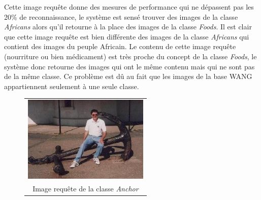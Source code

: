 	Cette image requête donne des mesures de performance qui ne dépassent pas les 20\% de reconnaissance, le système est sensé trouver des images de la classe \textit{Africans} alors qu'il retourne à la place des images de la classe \textit{Foods}. Il est clair que cette image requête est bien différente des images de la classe \textit{Africans} qui contient des images du peuple Africain. Le contenu de cette image requête (nourriture ou bien médicament) est très proche du concept de la classe \textit{Foods}, le système donc retourne des images qui ont le même contenu mais qui ne sont pas de la même classe. Ce problème est dû au fait que les images de la base WANG appartiennent seulement à une seule classe.

\begin{figure}[H]
\begin{tabular}{ccccc}\\


\multicolumn{5}{c}{\includegraphics[width=6cm]{Figures/anchor/0.jpg}}\\
\multicolumn{5}{c}{Image requête de la classe \textit{Anchor}}\\



\end{tabular}
\end{figure}
